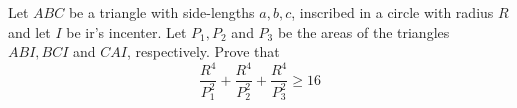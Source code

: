 Let $ABC$ be a triangle with side-lengths $a, b, c$,  inscribed in a circle with radius $R$ and let $I$ be ir's incenter. Let $P_1, P_2$ and $P_3$ be the areas of the triangles $ABI, BCI$ and $CAI$,  respectively. Prove that $$\frac{R^4}{P_1^2}+\frac{R^4}{P_2^2}+\frac{R^4}{P_3^2}\ge 16$$